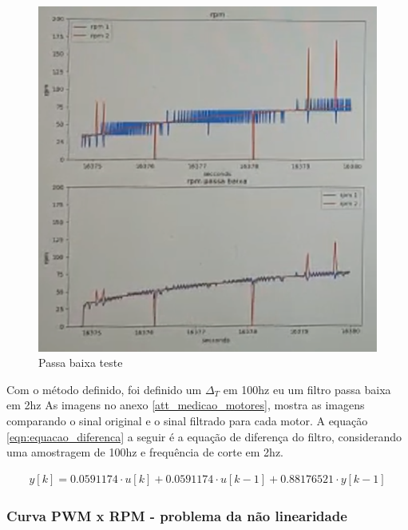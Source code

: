 \begin{figure}[h]
    \centering
    \includegraphics{figures/passa_baixa_teste}
    \caption{Passa baixa teste}
    \label{fig:passa_baixa_teste}
\end{figure}


Com o método definido, foi definido um $\Delta_{T}$ em 100hz eu um filtro passa baixa em 2hz
As imagens no anexo \ref{att_medicao_motores}, mostra as imagens comparando o sinal original e o sinal filtrado para cada motor.
A equação \ref{eqn:equacao_diferenca} a seguir é a equação de diferença do filtro, considerando uma amostragem de 100hz e frequência de corte em 2hz.

\begin{equation}
    \begin{split}
        y[k] = 0.0591174 \cdot u \left[ k \right] +  0.0591174 \cdot u[k - 1] + 0.88176521 \cdot y[k - 1]
    \end{split}
    \label{eqn:equacao_diferenca}
\end{equation}

\subsubsection{Curva PWM x RPM - problema da não linearidade}

